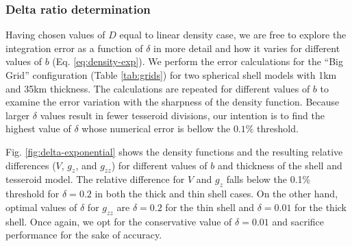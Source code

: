 \documentclass[extra]{gji}
\begin{document}
\subsubsection{Delta ratio determination}

Having chosen values of $D$ equal to linear density case, we are free to explore the
integration error as a function of $\delta$ in more detail and how it varies for
different values of $b$ (Eq. \ref{eq:density-exp}).
We perform the error calculations for the ``Big Grid'' configuration (Table
\ref{tab:grids}) for two spherical shell models with 1km and 35km thickness.
The calculations are repeated for different values of $b$ to examine the error variation
with the sharpness of the density function.
Because larger $\delta$ values result in fewer tesseroid divisions,
our intention is to find the highest value of $\delta$ whose numerical error is bellow
the $0.1\%$ threshold.

Fig. \ref{fig:delta-exponential} shows the density functions and the resulting relative
differences ($V$, $g_z$, and $g_{zz}$) for different values of $b$ and thickness of the
shell and tesseroid model.
The relative difference for $V$ and $g_z$ falls below the 0.1\% threshold for
$\delta = 0.2$ in both the thick and thin shell cases.
On the other hand, optimal values of $\delta$ for $g_{zz}$
are $\delta = 0.2$ for the thin shell and $\delta = 0.01$ for the thick shell.
Once again, we opt for the conservative value of $\delta = 0.01$ and sacrifice
performance for the sake of accuracy.
\end{document}
